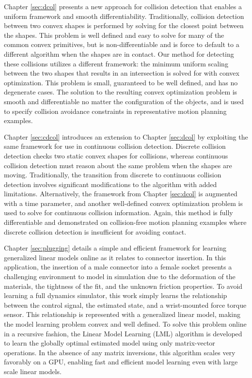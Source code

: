 Chapter \ref{sec:dcol} presents a new approach for collision detection that enables a uniform framework and smooth differentiability. Traditionally, collision detection between two convex shapes is performed by solving for the closest point between the shapes. This problem is well defined and easy to solve for many of the common convex primitives, but is non-differentiable and is force to default to a different algorithm when the shapes are in contact. Our method for detecting these collisions utilizes a different framework: the minimum uniform scaling between the two shapes that results in an intersection is solved for with convex optimization. This problem is small, guaranteed to be well defined, and has no degenerate cases. The solution to the resulting convex optimization problem is smooth and differentiable no matter the configuration of the objects, and is used to specify collision avoidance constraints in representative motion planning examples. 

Chapter \ref{sec:cdcol} introduces an extension to Chapter \ref{sec:dcol} by exploiting the same framework for use in continuous collision detection. Discrete collision detection checks two static convex shapes for collisions, whereas continuous collision detection must reason about the same problem when the shapes are moving. Traditionally, the transition from discrete to continuous collision detection involves significant modifications to the algorithm with added limitations. Alternatively, the framework from Chapter \ref{sec:dcol} is augmented with a time parameter, and another well-defined convex optimization problem is used to solve for continuous collision information. Again, this method is fully differentiable and demonstrated on collision-free motion planning examples where discrete collision detection is insufficient for avoiding contact. 

Chapter \ref{sec:plugging} details a simple and efficient framework for learning generalized linear models online as it relates to connector insertion. In this application, the insertion of a male connector into a female socket presents a challenging environment to model in simulation due to the deformation of the materials, the tightness of the fit, and the unknown friction properties. To avoid learning a full dynamics simulator, this work simply learns the relationship between the control signal, the estimated state, and a wrist-mounted force torque sensor. This relationship is represented with a generalized linear model, making the model learning problem convex and well defined. To solve this problem online in a recursive fashion, the Linear Model Learning (LML) algorithm is developed to learn the globally optimal estimated model using only matrix-vector operations. In the absence of any matrix inversions, this algorithm scales very favorably on a GPU, enabling fast and efficient model learning even with large scale linear models. 


